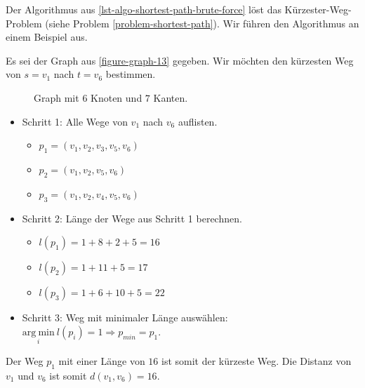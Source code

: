 Der Algorithmus aus \autoref{lst-algo-shortest-path-brute-force} löst das Kürzester-Weg-Problem (siehe Problem \autoref{problem-shortest-path}). Wir führen den Algorithmus an einem Beispiel aus.

\begin{example}
	Es sei der Graph aus \autoref{figure-graph-13} gegeben. Wir möchten den kürzesten Weg von $s = v_1$ nach $t = v_6$ bestimmen.

\begin{figure}[ht]
\centering
{}
\caption{Graph mit $6$ Knoten und $7$ Kanten.}
\label{figure-graph-13}
\end{figure}

\begin{itemize}
	\item Schritt 1: Alle Wege von $v_1$ nach $v_6$ auflisten.
	\begin{itemize}
		\item $p_1 = (v_1, v_2, v_3, v_5, v_6)$
		\item $p_2 = (v_1, v_2, v_5, v_6)$
		\item $p_3 = (v_1, v_2, v_4, v_5, v_6)$
	\end{itemize}	
	\item Schritt 2: Länge der Wege aus Schritt 1 berechnen.
	\begin{itemize}
		\item $l(p_1) = 1 + 8 + 2 + 5 = 16$
		\item $l(p_2) = 1 + 11 + 5 = 17$
		\item $l(p_3) = 1 + 6 + 10 + 5 = 22$
	\end{itemize}
	\item Schritt 3: Weg mit minimaler Länge auswählen: $\underset{i}{\mathrm{arg~min}}~l(p_i) = 1 \Rightarrow p_{min} = p_1$.
\end{itemize}

Der Weg $p_1$ mit einer Länge von $16$ ist somit der kürzeste Weg. Die Distanz von $v_1$ und $v_6$ ist somit $d(v_1, v_6) = 16$.

\end{example}

